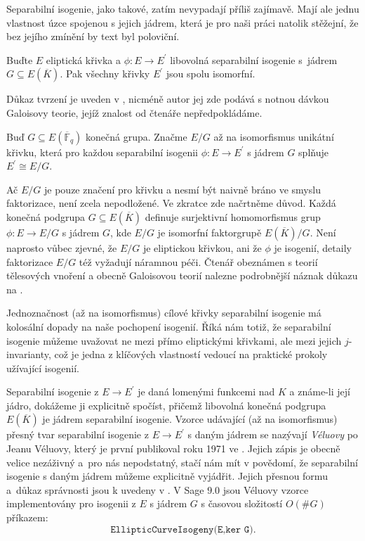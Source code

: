\documentclass[12pt]{report}
\begin{document}
Separabilní isogenie, jako takové, zatím nevypadají příliš zajímavě. Mají ale jednu vlastnost úzce spojenou s jejich jádrem, která je pro naši práci natolik stěžejní, že bez jejího zmínění by text byl poloviční.

\begin{veta}\label{isomor}
Buďte $E$ eliptická křivka a $\phi : E \longrightarrow E^\prime$ libovolná separabilní isogenie s~jádrem $G \subseteq E(\overline{K})$. Pak všechny křivky $E^\prime$ jsou spolu isomorfní.
\end{veta}
Důkaz tvrzení je uveden v \cite[Prop. 12.12]{Washington}, nicméně autor jej zde podává s notnou dávkou Galoisovy teorie, jejíž znalost od čtenáře nepředpokládáme.

\begin{znaceni}
Buď $G \subseteq E(\overline{\mathbb{F}}_q)$ konečná grupa. Značme $E/G$ až na isomorfismus unikátní křivku, která pro každou separabilní isogenii $\phi : E \longrightarrow E^\prime$ s jádrem $G$ splňuje $E^\prime \cong E/G$.
\end{znaceni}

\begin{poznamka}
Ač $E/G$ je pouze značení pro křivku a nesmí být naivně bráno ve smyslu faktorizace, není zcela nepodložené. Ve zkratce zde načrtněme důvod. Každá konečná podgrupa $G \subseteq E(\overline{K})$ definuje surjektivní homomorfismus grup $\phi : E \longrightarrow E/G$ s jádrem $G$, kde $E/G$ je isomorfní faktorgrupě $E(\overline{K})/G$. Není naprosto vůbec zjevné, že $E/G$ je eliptickou křivkou, ani že $\phi$ je isogenií, detaily faktorizace $E/G$ též vyžadují náramnou péči. Čtenář obeznámen s teorií tělesových vnoření a obecně Galoisovou teorií nalezne podrobnější náznak důkazu na \cite[Thm. 6.10.]{Sutherland}.
\end{poznamka}

Jednoznačnost (až na isomorfismus) cílové křivky separabilní isogenie má kolosální dopady na naše pochopení isogenií. Říká nám totiž, že separabilní isogenie můžeme uvažovat ne mezi přímo eliptickými křivkami, ale mezi jejich $j$-invarianty, což je jedna z klíčových vlastností vedoucí na praktické prokoly užívající isogenií.

Separabilní isogenie z $E \longrightarrow E^\prime$ je daná lomenými funkcemi nad $K$ a známe-li její jádro, dokážeme ji explicitně spočíst, přičemž libovolná konečná podgrupa $E(\overline{K})$ je jádrem separabilní isogenie. Vzorce udávající (až na isomorfismus) přesný tvar separabilní isogenie z $E \longrightarrow E^\prime$ s daným jádrem se nazývají \textit{Véluovy} po Jeanu Véluovy, který je první publikoval roku 1971 ve \cite{Velu}. Jejich zápis je obecně velice nezáživný a~pro nás nepodstatný, stačí nám mít v povědomí, že separabilní isogenie s daným jádrem můžeme explicitně vyjádřit. Jejich přesnou formu a~důkaz správnosti jsou k uvedeny v \cite[Ch.~8.2]{DeFeo}. V Sage $9.0$ jsou Véluovy vzorce implementovány pro isogenii z $E$ s jádrem $G$ s časovou složitostí $O(\# G)$ příkazem:
\begin{equation*}
\texttt{EllipticCurveIsogeny(E,ker G)}.
\end{equation*}
\end{document}
